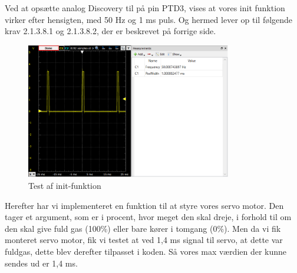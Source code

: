 \clearpage
Ved at opsætte analog Discovery til på pin PTD3, vises at vores init funktion virker efter hensigten, med 50 Hz og 1 ms puls. Og hermed lever op til følgende krav 2.1.3.8.1 og 2.1.3.8.2, der er beskrevet på forrige side.

\begin{figure}[h]
  \centering
  \includegraphics[width=0.8\textwidth]{mots4.png}
  \caption{Test af init-funktion}
  \label{fig:mots4}
\end{figure}

Herefter har vi implementeret en funktion til at styre vores servo motor. Den tager et argument, som er i procent, hvor meget den skal dreje, i forhold til om den skal give fuld gas (100\%) eller bare kører i tomgang (0\%). Men da vi fik monteret servo motor, fik vi testet at ved 1,4 ms signal til servo, at dette var fuldgas, dette blev derefter tilpasset i koden. Så vores max værdien der kunne sendes ud er 1,4 ms.

